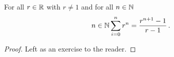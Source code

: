 \guard



\begin{prop}
\label{prop:sumOfGeometricSequence}
  For all $r\in\mathbb{R}$ with $r\not=1$ and for all $n\in\mathbb{N}$
  \[ n\in\mathbb{N}\sum_{i=0}^n r^n = \frac{r^{n+1}-1}{r-1} \,.\]
\end{prop}
\begin{proof}
  Left as an exercise to the reader.
\end{proof}
